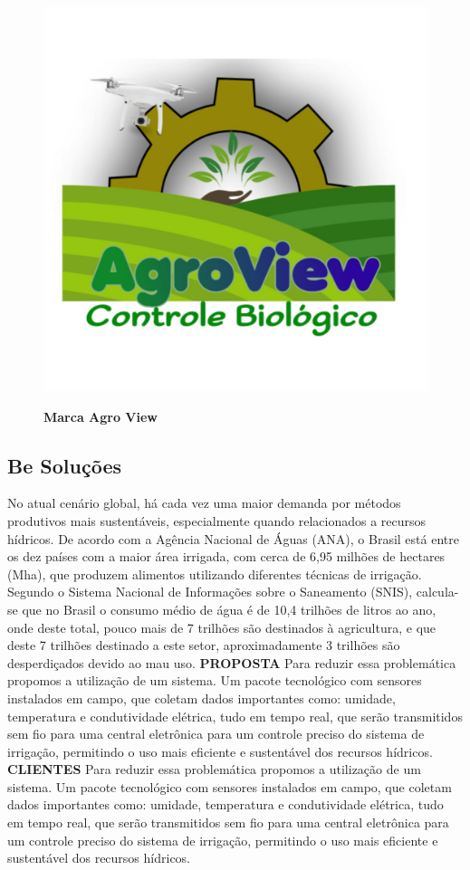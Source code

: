 \begin{figure}[!htb]
\centering
\caption{\textbf{Marca Agro View}}
\includegraphics[scale=0.2]{Imagens/agroview.jpg}
\label{figura_19}
\end{figure}


\subsection{Be Soluções}

No atual cenário global, há cada vez uma maior demanda por métodos produtivos mais sustentáveis, especialmente quando relacionados a recursos hídricos. De acordo com a Agência Nacional de Águas (ANA), o Brasil está entre os dez países com a maior área irrigada, com cerca de 6,95 milhões de hectares (Mha), que produzem alimentos utilizando diferentes técnicas de irrigação. Segundo o Sistema Nacional de Informações sobre o Saneamento (SNIS), calcula-se que no Brasil o consumo médio de água é de 10,4 trilhões de litros ao ano, onde deste total, pouco mais de 7 trilhões são destinados à agricultura, e que deste 7 trilhões destinado a este setor, aproximadamente 3 trilhões são desperdiçados devido ao mau uso.
\textbf{PROPOSTA}
Para reduzir essa problemática propomos a utilização de um sistema. Um pacote tecnológico com sensores instalados em campo, que coletam dados importantes como: umidade, temperatura e condutividade elétrica, tudo em tempo real, que serão transmitidos sem fio para uma central eletrônica para um controle preciso do sistema
de irrigação, permitindo o uso mais eficiente e sustentável dos recursos hídricos.
\textbf{CLIENTES}
Para reduzir essa problemática propomos a utilização de um sistema. Um pacote tecnológico com sensores instalados em campo, que coletam dados importantes como: umidade, temperatura e condutividade elétrica, tudo em tempo real, que serão transmitidos sem fio para uma central eletrônica para um controle preciso do sistema de irrigação, permitindo o uso mais eficiente e sustentável dos recursos hídricos.

